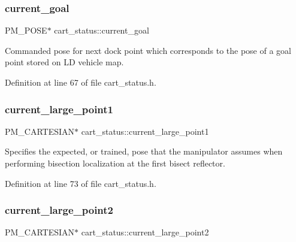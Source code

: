 \subsubsection{\texorpdfstring{current\+\_\+goal}{current\_goal}}
{\footnotesize\ttfamily P\+M\+\_\+\+P\+O\+SE$\ast$ cart\+\_\+status\+::current\+\_\+goal\hspace{0.3cm}{\ttfamily [private]}}

Commanded pose for next dock point which corresponds to the pose of a goal point stored on LD vehicle map. 

Definition at line 67 of file cart\+\_\+status.\+h.

\mbox{\label{classcart__status_ab8c619198ba84c252a3740d2271f530e}} 
\subsubsection{\texorpdfstring{current\+\_\+large\+\_\+point1}{current\_large\_point1}}
{\footnotesize\ttfamily P\+M\+\_\+\+C\+A\+R\+T\+E\+S\+I\+AN$\ast$ cart\+\_\+status\+::current\+\_\+large\+\_\+point1\hspace{0.3cm}{\ttfamily [private]}}

Specifies the expected, or trained, pose that the manipulator assumes when performing bisection localization at the first bisect reflector. 

Definition at line 73 of file cart\+\_\+status.\+h.

\mbox{\label{classcart__status_ab17505f9587a0b7c6d3111a8a1d38080}} 
\subsubsection{\texorpdfstring{current\+\_\+large\+\_\+point2}{current\_large\_point2}}
{\footnotesize\ttfamily P\+M\+\_\+\+C\+A\+R\+T\+E\+S\+I\+AN$\ast$ cart\+\_\+status\+::current\+\_\+large\+\_\+point2\hspace{0.3cm}{\ttfamily [private]}}

